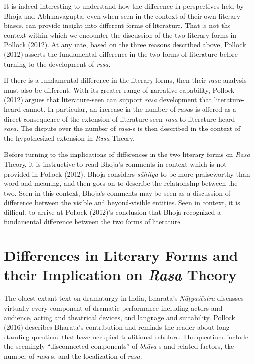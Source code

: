 It is indeed interesting to understand how the difference in perspectives held by Bhoja and Abhinavagupta, even when seen in the context of their own literary biases, can provide insight into different forms of literature. That is not the context within which we encounter the discussion of the two literary forms in Pollock (2012). At any rate, based on the three reasons described above, Pollock (2012) asserts the fundamental difference in the two forms of literature before turning to the development of \textsl{rasa}. 

If there is a fundamental difference in the literary forms, then their \textsl{rasa} analysis must also be different. With its greater range of narrative capability, Pollock (2012) argues that literature-seen can support \textsl{rasa} development that literature-heard cannot. In particular, an increase in the number of \textsl{rasa}s is offered as a direct consequence of the extension of literature-seen \textsl{rasa }to literature-heard \textsl{rasa}. The dispute over the number of \textsl{rasa}-s is then described in the context of the hypothesized extension in \textsl{Rasa} Theory.

Before turning to the implications of differences in the two literary forms on \textsl{Rasa} Theory, it is instructive to read Bhoja’s comments in context which is not provided in Pollock (2012). Bhoja considers \textsl{sāhitya} to be more praiseworthy than word and meaning, and then goes on to describe the relationship between the two. Seen in this context, Bhoja’s comments may be seen as a discussion of difference between the visible and beyond-visible entities. Seen in context, it is difficult to arrive at Pollock (2012)’s conclusion that Bhoja
 recognized a fundamental difference between the two forms of literature.

\section*{Differences in Literary Forms and their Implication on \textsl{Rasa} Theory}

The oldest extant text on dramaturgy in India, Bharata’s \textsl{Nāṭyaśāstra} discusses virtually every component of dramatic performance including actors and audience, acting and theatrical devices, and language and suitability. Pollock (2016) describes Bharata’s contribution and reminds the reader about long-standing questions that have occupied traditional scholars. The questions include the seemingly “disconne\-cted components” of \textsl{bhāva}-s and related factors, the number of \textsl{rasa}-s, and the localization of \textsl{rasa}.

